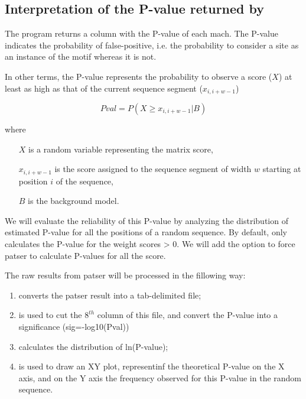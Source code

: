 \subsection{Interpretation of the P-value returned by }

The program  returns a column with the P-value of each
mach. The P-value indicates the probability of false-positive,
i.e. the probability to consider a site as an instance of the motif
whereas it is not.

In other terms, the P-value represents the probability to observe a
score ($X$) at least as high as that of the current sequence segment
($x_{i,i+w-1}$)

\begin{displaymath}
Pval = P(X \ge x_{i,i+w-1} | B)
\end{displaymath}

where 

\begin{itemize}
\item[$X$] is a random variable representing the matrix score,
\item[$x_{i,i+w-1}$] is the score assigned to the sequence segment of
  width $w$ starting at position $i$ of the sequence,
\item[$B$] is the background model.
\end{itemize}

We will evaluate the reliability of this P-value by analyzing the
distribution of estimated P-value for all the positions of a random
sequence. By default,  only calculates the P-value for
the weight scores > 0. We will add the option  to
force patser to calculate P-values for all the score.

The raw results from patser will be processed in the fillowing way: 
\begin{enumerate}
\item {} converts the patser result into a
  tab-delimited file;
\item {} is used to cut the $8^{th}$ column of this file,
  and convert the P-value into a significance (sig=-log10(Pval))
\item {} calculates the distribution of ln(P-value);
\item {} is used to draw an XY plot, representinf the
  theoretical P-value on the X axis, and on the Y axis the frequency
  observed for this P-value in the random sequence.
\end{enumerate}

